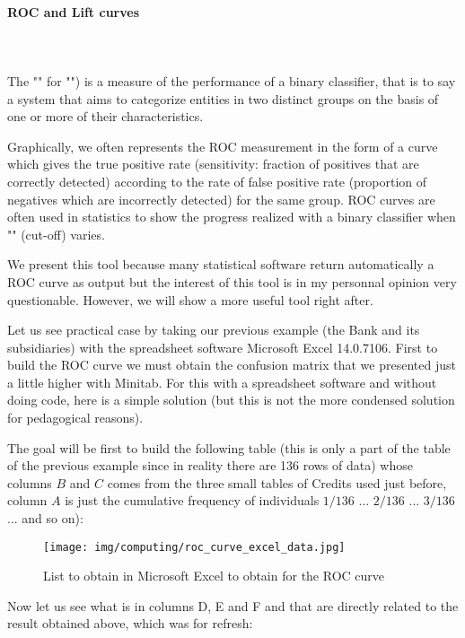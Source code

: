 	\paragraph{ROC and Lift curves}\mbox{}\\\\
	The "" for "") is a measure of the performance of a binary classifier, that is to say a system that aims to categorize entities in two distinct groups on the basis of one or more of their characteristics. 

	Graphically, we often represents the ROC measurement  in the form of a curve which gives the true positive rate (sensitivity: fraction of positives that are correctly detected) according to the rate of false positive rate (proportion of negatives which are incorrectly detected) for the same group. ROC curves are often used in statistics to show the progress realized with a binary classifier when "" (cut-off) varies.
	\begin{tcolorbox}[title=Remark,colframe=black,arc=10pt]
	We present this tool because many statistical software return automatically a ROC curve as output but the interest of this tool is in my personnal opinion very questionable. However, we will show a more useful tool right after.
	\end{tcolorbox}
	Let us see practical case by taking our previous example (the Bank and its subsidiaries) with the spreadsheet software Microsoft Excel 14.0.7106. First to build the ROC curve we must obtain the confusion matrix that we presented just a little higher with Minitab. For this with a spreadsheet software and without doing code, here is a simple solution (but this is not the more condensed solution for pedagogical reasons).
	
	The goal will be first to build the following table (this is only a part of the table of the previous example since in reality there are 136 rows of data) whose columns $B$ and $C$ comes from the three small tables of Credits used just before, column $A$ is just the cumulative frequency of individuals $1/136$ ... $2/136$ ... $3/136$ ... and so on):
	\begin{figure}[H]
		\centering
		\texttt{[image: img/computing/roc\_curve\_excel\_data.jpg]}
		\caption{List to obtain in Microsoft Excel to obtain for the ROC curve}
	\end{figure}
	Now let us see what is in columns D, E and F and that are directly related to the result obtained above, which was for refresh:
	
